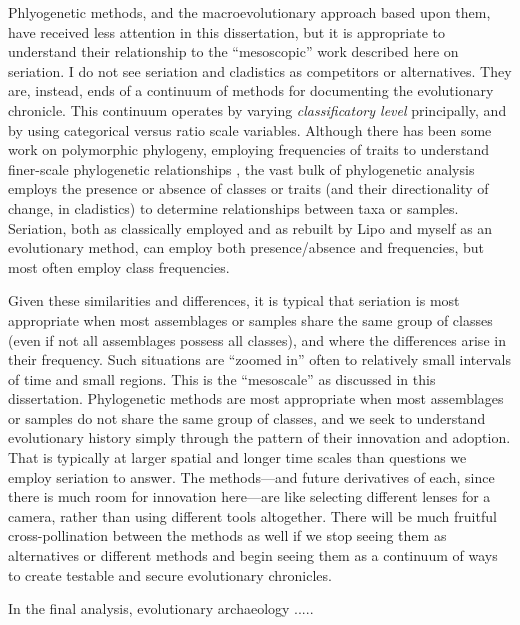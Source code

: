 Phlyogenetic methods, and the macroevolutionary approach based upon them, have received less attention in this dissertation, but it is appropriate to understand their relationship to the ``mesoscopic'' work described here on seriation.  I do not see seriation and cladistics as competitors or alternatives.  They are, instead, ends of a continuum of methods for documenting the evolutionary chronicle.  This continuum operates by varying \emph{classificatory level} principally, and by using categorical versus ratio scale variables.  Although there has been some work on polymorphic phylogeny, employing frequencies of traits to understand finer-scale phylogenetic relationships \citep{Wiens1999}, the vast bulk of phylogenetic analysis employs the presence or absence of classes or traits (and their directionality of change, in cladistics) to determine relationships between taxa or samples.  Seriation, both as classically employed and as rebuilt by Lipo and myself as an evolutionary method, can employ both presence/absence and frequencies, but most often employ class frequencies.  

Given these similarities and differences, it is typical that seriation is most appropriate when most assemblages or samples share the same group of classes (even if not all assemblages possess all classes), and where the differences arise in their frequency.  Such situations are ``zoomed in'' often to relatively small intervals of time and small regions.  This is the ``mesoscale'' as discussed in this dissertation.  Phylogenetic methods are most appropriate when most assemblages or samples do not share the same group of classes, and we seek to understand evolutionary history simply through the pattern of their innovation and adoption.  That is typically at larger spatial and longer time scales than questions we employ seriation to answer.  The methods---and future derivatives of each, since there is much room for innovation here---are like selecting different lenses for a camera, rather than using different tools altogether.  There will be much fruitful cross-pollination between the methods as well if we stop seeing them as alternatives or different methods and begin seeing them as a continuum of ways to create testable and secure evolutionary chronicles.

In the final analysis, evolutionary archaeology .....
